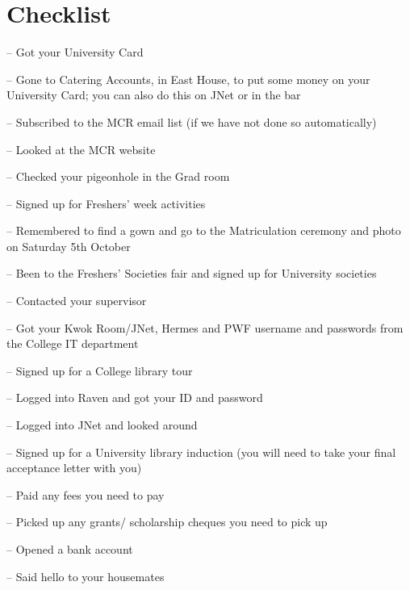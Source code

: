 \documentclass[11pt,fleqn, oneside]{book} %
\newenvironment{checklist}{%
  \begin{list}{}{}%
  \let\olditem\item
  \renewcommand\item{\olditem -- \marginpar{$\Box$} }
  \newcommand\checkeditem{\olditem -- \marginpar{$\CheckedBox$} }
}{%
  \end{list}
  }
\begin{document}

\chapter{Checklist}
\begin{checklist}
  \item   Got your University Card
  \item   Gone to Catering Accounts, in East House, to put some money on your University Card; you can also do this on JNet or in the bar
  \item   Subscribed to the MCR email list (if we have not done so automatically)
  \item   Looked at the MCR website
  \item   Checked your pigeonhole in the Grad room
  \item   Signed up for Freshers’ week activities
  \item   Remembered to find a gown and go to the Matriculation ceremony and photo on Saturday 5th October
  \item   Been to the Freshers' Societies fair and signed up for University societies
  \item   Contacted your supervisor
  \item   Got your Kwok Room/JNet, Hermes and PWF username and passwords from the College IT department 
  \item   Signed up for a College library tour 
  \item   Logged into Raven and got your ID and password
  \item   Logged into JNet and looked around 
  \item   Signed up for a University library induction (you will need to take your final acceptance letter with you) 
  \item   Paid any fees you need to pay
  \item   Picked up any grants/ scholarship cheques you need to pick up 
  \item   Opened a bank account
  \item   Said hello to your housemates
\end{checklist}
\end{document}
